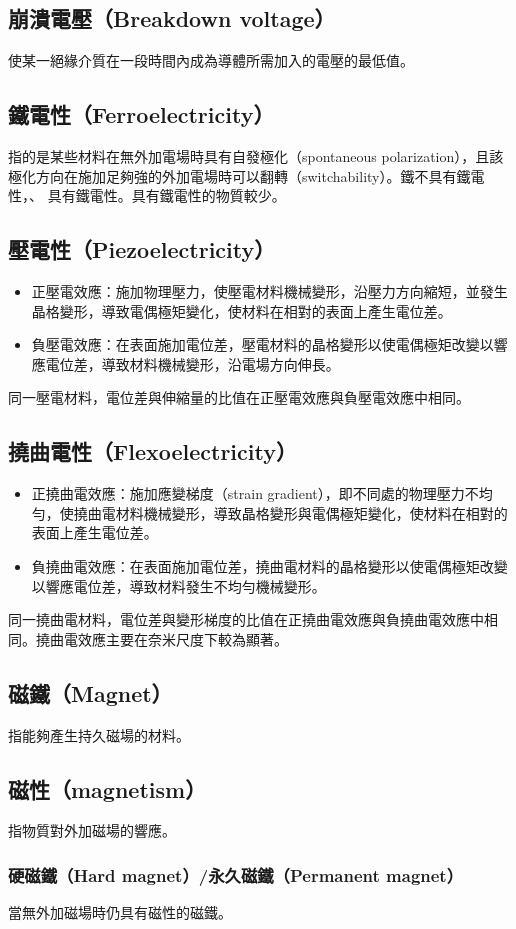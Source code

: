 \documentclass[a4paper,12pt]{report}
\begin{document}
\begin{itemize}
\subsection{崩潰電壓（Breakdown voltage）}
使某一絕緣介質在一段時間內成為導體所需加入的電壓的最低值。
\subsection{鐵電性（Ferroelectricity）}
指的是某些材料在無外加電場時具有自發極化（spontaneous polarization），且該極化方向在施加足夠強的外加電場時可以翻轉（switchability）。鐵不具有鐵電性，、 具有鐵電性。具有鐵電性的物質較少。
\subsection{壓電性（Piezoelectricity）}
\begin{itemize}
\item 正壓電效應：施加物理壓力，使壓電材料機械變形，沿壓力方向縮短，並發生晶格變形，導致電偶極矩變化，使材料在相對的表面上產生電位差。
\item 負壓電效應：在表面施加電位差，壓電材料的晶格變形以使電偶極矩改變以響應電位差，導致材料機械變形，沿電場方向伸長。
\end{itemize}
同一壓電材料，電位差與伸縮量的比值在正壓電效應與負壓電效應中相同。
\subsection{撓曲電性（Flexoelectricity）}
\begin{itemize}
\item 正撓曲電效應：施加應變梯度（strain gradient），即不同處的物理壓力不均勻，使撓曲電材料機械變形，導致晶格變形與電偶極矩變化，使材料在相對的表面上產生電位差。
\item 負撓曲電效應：在表面施加電位差，撓曲電材料的晶格變形以使電偶極矩改變以響應電位差，導致材料發生不均勻機械變形。
\end{itemize}
同一撓曲電材料，電位差與變形梯度的比值在正撓曲電效應與負撓曲電效應中相同。撓曲電效應主要在奈米尺度下較為顯著。
\subsection{磁鐵（Magnet）}
指能夠產生持久磁場的材料。
\subsection{磁性（magnetism）}
指物質對外加磁場的響應。
\subsubsection{硬磁鐵（Hard magnet）/永久磁鐵（Permanent magnet）}
當無外加磁場時仍具有磁性的磁鐵。

\end{itemize}
\end{document}
